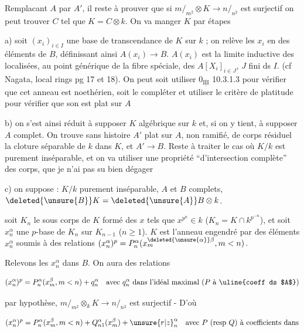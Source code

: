 

Remplacant $A$ par $A'$, il reste à prouver que si $m/_{m^2}\otimes K\longrightarrow n/_{n^2}$ est surjectif  on peut trouver $C$ tel que $K=C\otimes k$. On va manger $K$ par étapes

a) soit $(x_i)_{i\in I}$ une base de transcendance de $K$ sur $k$ ;  on relève les $x_i$ en des éléments de $B$, définissant ainsi $A(x_i)\longrightarrow B$. $A(x_i)$ est la limite inductive des localisées, au point générique de la fibre spéciale, des $A[X_i]_{i\in J}$, $J$ fini ds $I$. (cf Nagata, local rings pg 17 et 18). On peut soit utiliser $0_{\overline{\underline{\mathrm{III}}}}$ 10.3.1.3 pour vérifier que cet anneau est noethérien, soit le compléter et utiliser le critère de platitude pour vérifier que son  est plat sur $A$

b) on s'est ainsi réduit à supposer $K$ algébrique sur $k$ et, si on y tient, à supposer $A$ complet. On trouve sans histoire $A'$ plat sur $A$, non ramifié, de corps résiduel la cloture séparable de $k$ dans $K$, et $A'\longrightarrow B$. Reste à traiter le cas où $K/k$ est purement inséparable, et on va utiliser une propriété ``d'intersection complète'' des corps, que je n'ai pas su bien dégager

c) on suppose : $K/k$ purement inséparable, $A$ et $B$ complets, $\deleted{\unsure{B}}K=\deleted{\unsure{A}}B\otimes k$.

soit $K_n$ le sous corps de $K$ formé des $x$ tels que $x^{p^n}\in k$ ($K_n=K\cap k^{p^{-n}}$), et soit $x_n^\alpha$ une $p$-base de $K_n$ sur $K_{n-1}$ ($n\geq1$). $K$ est  l'anneau engendré par des éléments $x_n^\alpha$ soumis à des relations $(x_n^\alpha)^p=P_n^\alpha(x_m^{\deleted{\unsure{\alpha}}\beta},m<n)$. 

Relevons les $x_n^\alpha$ dans $B$. On aura des relations

\[
(x_n^\alpha)^p=P_n^\alpha(x_m^\beta,m<n)+q_n^\alpha\quad\text{avec }q_n^\alpha\text{ dans l'idéal maximal }(P\text{ à \uline{coeff ds $A$}})
\]

par hypothèse, $m/_{m^2}\otimes_k K\longrightarrow n/_{n^2}$ est surjectif - D'où

\[
(x_n^\alpha)^p=P_n^\alpha(x_m^\beta,m<n)+Q_{n1}^\alpha(x_m^\beta)+{\unsure{r|z}}_n^\alpha
\quad\text{avec }P\ (\text{resp }Q)\text{ à coefficients dans}
\]

